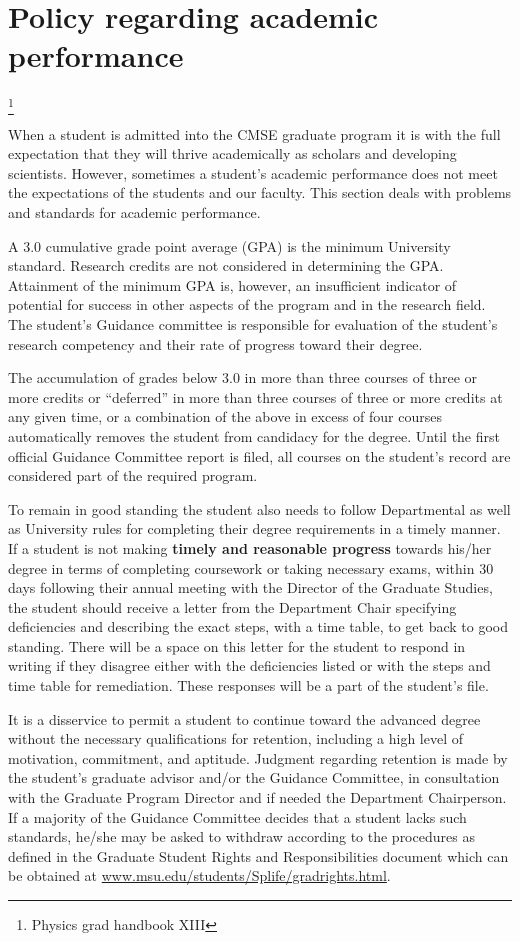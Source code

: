 \section{Policy regarding academic performance}\footnote{Physics grad
  handbook XIII}

When a student is admitted into the CMSE graduate program it is with
the full expectation that they will thrive academically as scholars
and developing scientists. However, sometimes a student's academic
performance does not meet the expectations of the students and our
faculty.  This section deals with problems and standards for academic performance.

A 3.0 cumulative grade point average (GPA) is the minimum University
standard. Research credits are not considered in determining the
GPA. Attainment of the minimum GPA is, however, an insufficient
indicator of potential for success in other aspects of the program and
in the research field. The student's Guidance committee is responsible
for evaluation of the student's research competency and their rate of
progress toward their degree. 

The accumulation of grades below 3.0 in more than three courses of
three or more credits or ``deferred'' in more than three courses of
three or more credits at any given time, or a combination of the above
in excess of four courses automatically removes the student from
candidacy for the degree. Until the first official Guidance Committee
report is filed, all courses on the student's record are considered
part of the required program.

To remain in good standing the student also needs to follow
Departmental as well as University rules for completing their degree
requirements in a timely manner.  If a student is not making
\textbf{timely and reasonable progress} towards his/her degree in
terms of completing coursework or taking necessary exams, within 30
days following their annual meeting with the Director of the Graduate
Studies, the student should receive a letter from the Department Chair
specifying deficiencies and describing the exact steps, with a time
table, to get back to good standing.  There will be a space on this
letter for the student to respond in writing if they disagree either
with the deficiencies listed or with the steps and time table for
remediation. These responses will be a part of the student's file.

It is a disservice to permit a student to continue toward the advanced
degree without the necessary qualifications for retention, including a
high level of motivation, commitment, and aptitude.  Judgment
regarding retention is made by the student's graduate advisor and/or
the Guidance Committee, in consultation with the Graduate Program
Director and if needed the Department Chairperson.  If a majority of
the Guidance Committee decides that a
student lacks such standards, he/she may be asked to withdraw
according to the procedures as defined in the Graduate Student Rights
and Responsibilities document which can be obtained at
\url{www.msu.edu/students/Splife/gradrights.html}.

